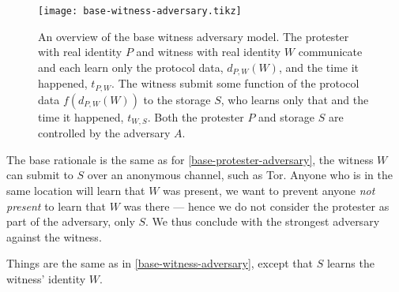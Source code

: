 \begin{figure}
  \centering
  \texttt{[image: base-witness-adversary.tikz]}
  \caption{\label{fig:witness-adversary}%
    An overview of the base witness adversary model.
    The protester with real identity \(P\) and witness with real identity \(W\) 
    communicate and each learn only the protocol data, \(d_{P,W}(W)\), and the 
    time it happened, \(t_{P,W}\).
    The witness submit some function of the protocol data \(f(d_{P,W}(W))\) to 
    the storage \(S\), who learns only that and the time it happened, 
    \(t_{W,S}\).
    Both the protester \(P\) and storage \(S\) are controlled by the adversary 
    \(A\).
  }
\end{figure}

The base rationale is the same as for \cref{base-protester-adversary}, the 
witness \(W\) can submit to \(S\) over an anonymous channel, such as \ac{Tor}.
Anyone who is in the same location will learn that \(W\) was present, we want 
to prevent anyone \emph{not present} to learn that \(W\) was there --- hence we 
do not consider the protester as part of the adversary, only \(S\).
We thus conclude with the strongest adversary against the witness.

\begin{definition}
  Things are the same as in \cref{base-witness-adversary}, except that \(S\) 
  learns the witness' identity \(W\).
\end{definition}
